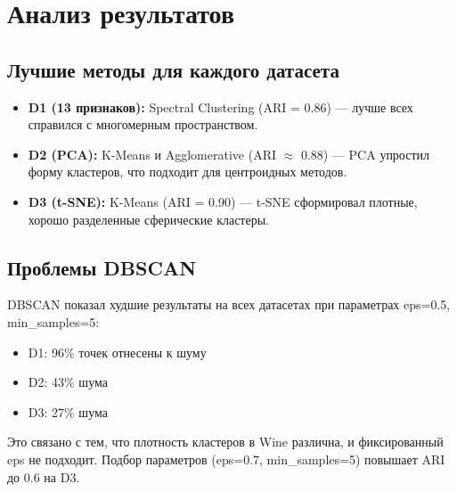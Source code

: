\documentclass[a4paper,12pt]{article}
\begin{document}
\section*{Анализ результатов}

\subsection*{Лучшие методы для каждого датасета}
\begin{itemize}
    \item \textbf{D1 (13 признаков):} Spectral Clustering (ARI = 0.86) — лучше всех справился с многомерным пространством.
    \item \textbf{D2 (PCA):} K-Means и Agglomerative (ARI $\approx$ 0.88) — PCA упростил форму кластеров, что подходит для центроидных методов.
    \item \textbf{D3 (t-SNE):} K-Means (ARI = 0.90) — t-SNE сформировал плотные, хорошо разделенные сферические кластеры.
\end{itemize}

\subsection*{Проблемы DBSCAN}
DBSCAN показал худшие результаты на всех датасетах при параметрах eps=0.5, min\_samples=5:
\begin{itemize}
    \item D1: 96\% точек отнесены к шуму
    \item D2: 43\% шума
    \item D3: 27\% шума
\end{itemize}
Это связано с тем, что плотность кластеров в Wine различна, и фиксированный eps не подходит. Подбор параметров (eps=0.7, min\_samples=5) повышает ARI до 0.6 на D3.
\end{document}
